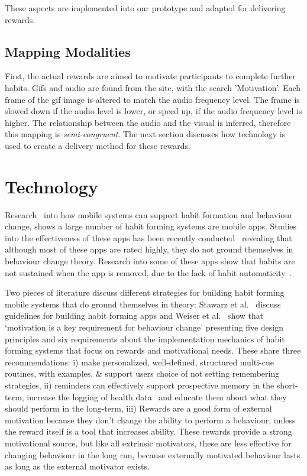 \documentclass{scaffold/sigchi}
\begin{document}
These aspects are implemented into our prototype and adapted for delivering rewards.

\subsection{Mapping Modalities}
First, the actual rewards are aimed to motivate participants to complete further habits. Gifs and audio are found from the site, with the search 'Motivation'. Each frame of the gif image is altered to match the audio frequency level. The frame is slowed down if the audio level is lower, or speed up, if the audio frequency level is higher. The relationship between the audio and the visual is inferred, therefore this mapping is \textit{semi-congruent}. The next section discusses how technology is used to create a delivery method for these rewards.

\section{Technology}



Research~\cite{survey_on_apps_2,survey_on_current_apps_of_steel} into how mobile systems can support habit formation and behaviour change, shows a large number of habit forming systems are mobile apps. Studies into the effectiveness of these apps has been recently conducted~\cite{article_beyond_self_tracking_designing_apps, article_dont_kick_habit} revealing that although most of these apps are rated highly, they do not ground themselves in behaviour change theory. Research into some of these apps show that habits are not sustained when the app is removed, due to the lack of habit automaticity~\cite{article_beyond_self_tracking_designing_apps}.

Two pieces of literature discuss different strategies for building habit forming mobile systems that do ground themselves in theory: Stawarz et al.~\cite{article_beyond_self_tracking_designing_apps} discuss guidelines for building habit forming apps and Weiser et al.~\cite{article_taxonomy_motivational_affordances_meaningful} show that `motivation is a key requirement for behaviour change' presenting five design principles and six requirements about the implementation mechanics of habit forming systems that focus on rewards and motivational needs. These share three recommendations: i) make personalized, well-defined, structured multi-cue routines, with examples, \& support users choice of not setting remembering strategies, ii) reminders can effectively support prospective memory in the short-term, increase the logging of health data~\cite{the_power_of_logging_mobile_notifications} and educate them about what they should perform in the long-term, iii) Rewards are a good form of external motivation because they don't change the ability to perform a behaviour, unless the reward itself is a tool that increases ability. These rewards provide a strong motivational source, but like all extrinsic motivators, these are less effective for changing behaviour in the long run, because externally motivated behaviour lasts as long as the external motivator exists.
\end{document}
